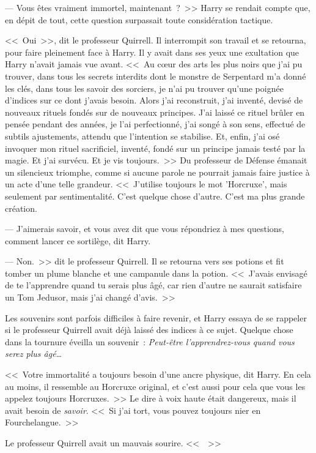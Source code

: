 --- Vous êtes vraiment immortel, maintenant~?~>> Harry se rendait compte que, en dépit de tout, cette question surpassait toute considération tactique.

<<~Oui~>>, dit le professeur Quirrell. Il interrompit son travail et se retourna, pour faire pleinement face à Harry. Il y avait dans ses yeux une exultation que Harry n'avait jamais vue avant. <<~Au cœur des arts les plus noirs que j'ai pu trouver, dans tous les secrets interdits dont le monstre de Serpentard m'a donné les clés, dans tous les savoir des sorciers, je n'ai pu trouver qu'une poignée d'indices sur ce dont j'avais besoin. Alors j'ai reconstruit, j'ai inventé, devisé de nouveaux rituels fondés sur de nouveaux principes. J'ai laissé ce rituel brûler en pensée pendant des années, je l'ai perfectionné, j'ai songé à son sens, effectué de subtils ajustements, attendu que l'intention se stabilise. Et, enfin, j'ai osé invoquer mon rituel sacrificiel, inventé, fondé sur un principe jamais testé par la magie. Et j'ai survécu. Et je vis toujours.~>> Du professeur de Défense émanait un silencieux triomphe, comme si aucune parole ne pourrait jamais faire justice à un acte d'une telle grandeur. <<~J'utilise toujours le mot 'Horcruxe', mais seulement par sentimentalité. C'est quelque chose d'autre. C'est ma plus grande création.

--- J'aimerais savoir, et vous avez dit que vous répondriez à mes questions, comment lancer ce sortilège, dit Harry.

--- Non.~>> dit le professeur Quirrell. Il se retourna vers ses potions et fit tomber un plume blanche et une campanule dans la potion. <<~J'avais envisagé de te l'apprendre quand tu serais plus âgé, car rien d'autre ne saurait satisfaire un Tom Jedusor, mais j'ai changé d'avis.~>>

Les souvenirs sont parfois difficiles à faire revenir, et Harry essaya de se rappeler si le professeur Quirrell avait déjà laissé des indices à ce sujet. Quelque chose dans la tournure éveilla un souvenir~: \emph{Peut-être l'apprendrez-vous quand vous serez plus âgé…}

<<~Votre immortalité a toujours besoin d'une ancre physique, dit Harry. En cela au moins, il ressemble au Horcruxe original, et c'est aussi pour cela que vous les appelez toujours Horcruxes.~>> Le dire à voix haute était dangereux, mais il avait besoin de \emph{savoir}. <<~Si j'ai tort, vous pouvez toujours nier en Fourchelangue.~>>

Le professeur Quirrell avait un mauvais sourire. <<~~>>

